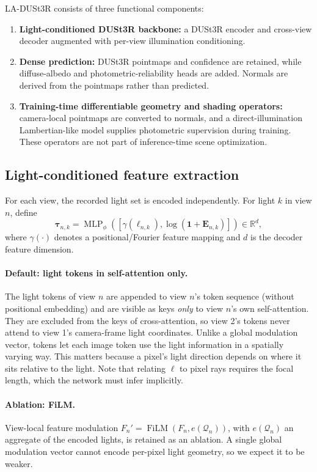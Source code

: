 \documentclass[11pt,a4paper]{article}
\newcommand{\R}{\mathbb{R}}
\begin{document}
LA-DUSt3R consists of three functional components:
\begin{enumerate}
  \item \textbf{Light-conditioned DUSt3R backbone:} a DUSt3R encoder and
  cross-view decoder augmented with per-view illumination conditioning.
  \item \textbf{Dense prediction:} DUSt3R pointmaps and confidence are
  retained, while diffuse-albedo and photometric-reliability heads are added. Normals are derived from the
  pointmaps rather than predicted.
  \item \textbf{Training-time differentiable geometry and shading operators:}
  camera-local pointmaps are converted to normals, and a direct-illumination
  Lambertian-like model supplies photometric supervision during training.
  These operators are not part of inference-time scene optimization.
\end{enumerate}

\subsection{Light-conditioned feature extraction}

For each view, the recorded light set is encoded independently. For
light $k$ in view $n$, define
\[
  \bm{\tau}_{n,k}
  =
  \operatorname{MLP}_{\phi}
  \left(
    \left[
      \gamma(\bm{\ell}_{n,k}),
      \log(\bm{1}+\bm{E}_{n,k})
    \right]
  \right)
  \in\R^{d},
\]
where $\gamma(\cdot)$ denotes a positional/Fourier feature mapping and
$d$ is the decoder feature dimension.

\paragraph{Default: light tokens in self-attention only.}
The light tokens of view $n$ are appended to view $n$'s token sequence
(without positional embedding) and are visible as keys \emph{only} to view
$n$'s own self-attention. They are excluded from the keys of cross-attention,
so view 2's tokens never attend to view 1's camera-frame light coordinates.
Unlike a global modulation vector, tokens let each image token use the light
information in a spatially varying way. This matters because a pixel's
light direction depends on where it sits relative to the light. Note that
relating $\bm\ell$ to pixel rays requires the focal length, which the network
must infer implicitly.

\paragraph{Ablation: FiLM.}
View-local feature modulation
$F_n'=\operatorname{FiLM}(F_n,e(\mathcal{Q}_n))$, with $e(\mathcal{Q}_n)$
an aggregate of the encoded lights, is retained as an ablation. A single
global modulation vector cannot encode per-pixel light geometry, so we
expect it to be weaker.
\end{document}
